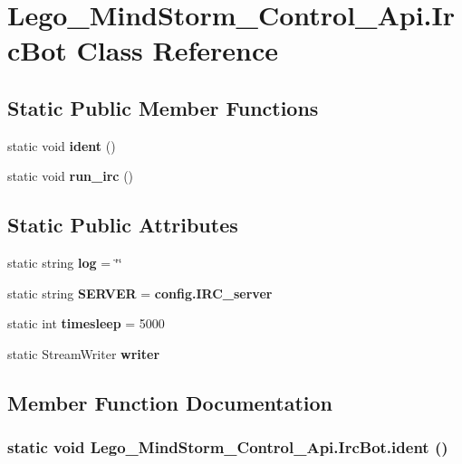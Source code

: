 \section{Lego\_\-MindStorm\_\-Control\_\-Api.IrcBot Class Reference}
\label{class_lego___mind_storm___control___api_1_1_irc_bot}
\subsection*{Static Public Member Functions}
\begin{CompactItemize}
\item 
static void {\bf ident} ()
\item 
static void {\bf run\_\-irc} ()
\end{CompactItemize}
\subsection*{Static Public Attributes}
\begin{CompactItemize}
\item 
static string {\bf log} = \char`\"{}\char`\"{}
\item 
static string {\bf SERVER} = {\bf config.IRC\_\-server}
\item 
static int {\bf timesleep} = 5000
\item 
static StreamWriter {\bf writer}
\end{CompactItemize}


\subsection{Member Function Documentation}
\subsubsection[{ident}]{\setlength{\rightskip}{0pt plus 5cm}static void Lego\_\-MindStorm\_\-Control\_\-Api.IrcBot.ident ()\hspace{0.3cm}{\tt  [static]}}\label{class_lego___mind_storm___control___api_1_1_irc_bot_bcd43141bb1fd519155b49d0c6546697}


